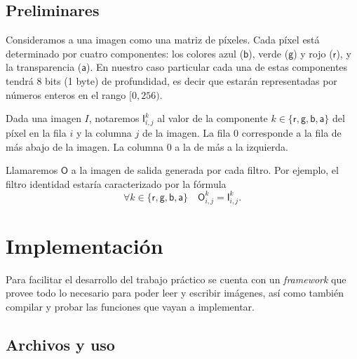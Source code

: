 \documentclass[a4paper, 12pt]{article}
\newcommand{\Alpha}{\ensuremath{\mathsf{a}}\xspace}
\newcommand{\Red  }{\ensuremath{\mathsf{r}}\xspace}
\newcommand{\Green}{\ensuremath{\mathsf{g}}\xspace}
\newcommand{\Blue }{\ensuremath{\mathsf{b}}\xspace}
\begin{document}
\subsection{Preliminares}

Consideramos a una imagen como una matriz de píxeles. Cada píxel está determinado por cuatro componentes: los colores azul (\Blue), verde (\Green) y rojo (\Red), y la transparencia (\Alpha). En nuestro caso particular cada una de estas componentes tendrá 8 bits (1 byte) de profundidad, es decir que estarán representadas por números enteros en el rango $[0,256)$.



Dada una imagen $I$, notaremos $\mathsf{I}_{i,j}^k$ al valor de la componente $k \in \{ \Red, \Green, \Blue, \Alpha \}$ del píxel en la fila $i$ y la columna $j$ de la imagen.
La fila 0 corresponde a la fila de más abajo de la imagen.
La columna 0 a la de más a la izquierda.

Llamaremos $\mathsf{O}$ a la imagen de salida generada por cada filtro. Por ejemplo, el filtro identidad estaría caracterizado por la fórmula
\[ \forall k \in \{\Red,\Green,\Blue,\Alpha\} \quad \mathsf{O}_{i,j}^k = \mathsf{I}_{i,j}^k. \]





\section{Implementación}

Para facilitar el desarrollo del trabajo práctico se cuenta con un
\emph{framework} que provee todo lo necesario para poder leer y
escribir imágenes, así como también compilar y probar las funciones
que vayan a implementar.

\subsection{Archivos y uso}
\end{document}
